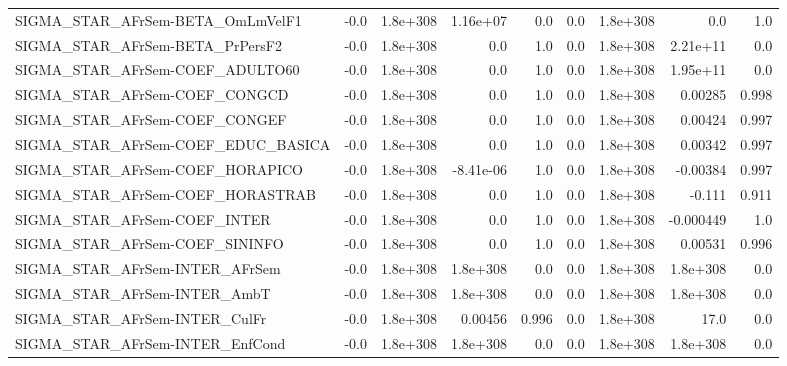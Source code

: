 \begin{tabular}{lrrrrrrrr}
SIGMA\_STAR\_AFrSem-BETA\_OmLmVelF1      &        -0.0 &     1.8e+308 &   1.16e+07 &      0.0 &        0.0 &    1.8e+308 &          0.0 &           1.0 \\
SIGMA\_STAR\_AFrSem-BETA\_PrPersF2       &        -0.0 &     1.8e+308 &        0.0 &      1.0 &        0.0 &    1.8e+308 &     2.21e+11 &           0.0 \\
SIGMA\_STAR\_AFrSem-COEF\_ADULTO60       &        -0.0 &     1.8e+308 &        0.0 &      1.0 &        0.0 &    1.8e+308 &     1.95e+11 &           0.0 \\
SIGMA\_STAR\_AFrSem-COEF\_CONGCD         &        -0.0 &     1.8e+308 &        0.0 &      1.0 &        0.0 &    1.8e+308 &      0.00285 &         0.998 \\
SIGMA\_STAR\_AFrSem-COEF\_CONGEF         &        -0.0 &     1.8e+308 &        0.0 &      1.0 &        0.0 &    1.8e+308 &      0.00424 &         0.997 \\
SIGMA\_STAR\_AFrSem-COEF\_EDUC\_BASICA    &        -0.0 &     1.8e+308 &        0.0 &      1.0 &        0.0 &    1.8e+308 &      0.00342 &         0.997 \\
SIGMA\_STAR\_AFrSem-COEF\_HORAPICO       &        -0.0 &     1.8e+308 &  -8.41e-06 &      1.0 &        0.0 &    1.8e+308 &     -0.00384 &         0.997 \\
SIGMA\_STAR\_AFrSem-COEF\_HORASTRAB      &        -0.0 &     1.8e+308 &        0.0 &      1.0 &        0.0 &    1.8e+308 &       -0.111 &         0.911 \\
SIGMA\_STAR\_AFrSem-COEF\_INTER          &        -0.0 &     1.8e+308 &        0.0 &      1.0 &        0.0 &    1.8e+308 &    -0.000449 &           1.0 \\
SIGMA\_STAR\_AFrSem-COEF\_SININFO        &        -0.0 &     1.8e+308 &        0.0 &      1.0 &        0.0 &    1.8e+308 &      0.00531 &         0.996 \\
SIGMA\_STAR\_AFrSem-INTER\_AFrSem        &        -0.0 &     1.8e+308 &   1.8e+308 &      0.0 &        0.0 &    1.8e+308 &     1.8e+308 &           0.0 \\
SIGMA\_STAR\_AFrSem-INTER\_AmbT          &        -0.0 &     1.8e+308 &   1.8e+308 &      0.0 &        0.0 &    1.8e+308 &     1.8e+308 &           0.0 \\
SIGMA\_STAR\_AFrSem-INTER\_CulFr         &        -0.0 &     1.8e+308 &    0.00456 &    0.996 &        0.0 &    1.8e+308 &         17.0 &           0.0 \\
SIGMA\_STAR\_AFrSem-INTER\_EnfCond       &        -0.0 &     1.8e+308 &   1.8e+308 &      0.0 &        0.0 &    1.8e+308 &     1.8e+308 &           0.0 \\

\end{tabular}
